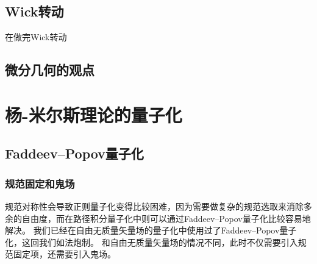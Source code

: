 \documentclass[hyperref, UTF8, a4paper]{ctexart}
\begin{document}
\subsection{Wick转动}

在做完Wick转动

\subsection{微分几何的观点}

\section{杨-米尔斯理论的量子化}

\subsection{Faddeev–Popov量子化}

\subsubsection{规范固定和鬼场}

规范对称性会导致正则量子化变得比较困难，因为需要做复杂的规范选取来消除多余的自由度，而在路径积分量子化中则可以通过Faddeev–Popov量子化比较容易地解决。
我们已经在自由无质量矢量场的量子化中使用过了Faddeev–Popov量子化，这回我们如法炮制。
和自由无质量矢量场的情况不同，此时不仅需要引入规范固定项，还需要引入鬼场。
\end{document}
